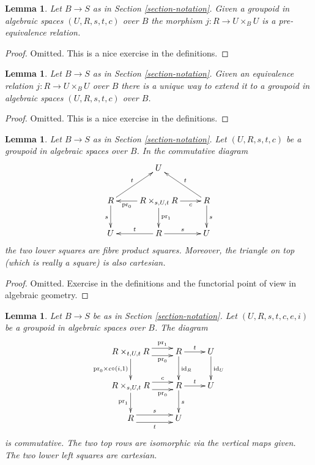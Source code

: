 \documentclass{stacks-project}
\theoremstyle{plain}
\newtheorem{lemma}[subsection]{Lemma}
\theoremstyle{definition}
\theoremstyle{remark}
\numberwithin{equation}{subsection}
\begin{document}
\begin{lemma}
\label{lemma-groupoid-pre-equivalence}
Let $B \to S$ as in Section \ref{section-notation}.
Given a groupoid in algebraic spaces $(U, R, s, t, c)$ over $B$
the morphism $j : R \to U \times_B U$ is a pre-equivalence
relation.
\end{lemma}

\begin{proof}
Omitted.
This is a nice exercise in the definitions.
\end{proof}

\begin{lemma}
\label{lemma-equivalence-groupoid}
Let $B \to S$ as in Section \ref{section-notation}.
Given an equivalence relation $j : R \to U \times_B U$ over $B$
there is a unique way to extend it to a groupoid in algebraic spaces
$(U, R, s, t, c)$ over $B$.
\end{lemma}

\begin{proof}
Omitted.
This is a nice exercise in the definitions.
\end{proof}

\begin{lemma}
\label{lemma-diagram}
Let $B \to S$ as in Section \ref{section-notation}.
Let $(U, R, s, t, c)$ be a groupoid in algebraic spaces over $B$.
In the commutative diagram
$$
\xymatrix{
& U & \\
R \ar[d]_s \ar[ru]^t &
R \times_{s, U, t} R
\ar[l]^-{\text{pr}_0} \ar[d]^{\text{pr}_1} \ar[r]_-c &
R \ar[d]^s \ar[lu]_t \\
U & R \ar[l]_t \ar[r]^s & U
}
$$
the two lower squares are fibre product squares.
Moreover, the triangle on top (which is really a square)
is also cartesian.
\end{lemma}

\begin{proof}
Omitted.
Exercise in the definitions and the functorial point of
view in algebraic geometry.
\end{proof}

\begin{lemma}
\label{lemma-diagram-pull}
Let $B \to S$ be as in Section \ref{section-notation}.
Let $(U, R, s, t, c, e, i)$ be a groupoid in algebraic spaces over $B$.
The diagram
\begin{equation}
\label{equation-pull}
\xymatrix{
R \times_{t, U, t} R
\ar@<1ex>[r]^-{\text{pr}_1} \ar@<-1ex>[r]_-{\text{pr}_0}
\ar[d]_{\text{pr}_0 \times c \circ (i, 1)} &
R \ar[r]^t \ar[d]^{\text{id}_R} &
U \ar[d]^{\text{id}_U} \\
R \times_{s, U, t} R
\ar@<1ex>[r]^-c \ar@<-1ex>[r]_-{\text{pr}_0} \ar[d]_{\text{pr}_1} &
R \ar[r]^t \ar[d]^s &
U \\
R \ar@<1ex>[r]^s \ar@<-1ex>[r]_t &
U
}
\end{equation}
is commutative. The two top rows are isomorphic via the vertical maps given.
The two lower left squares are cartesian.
\end{lemma}
\end{document}
